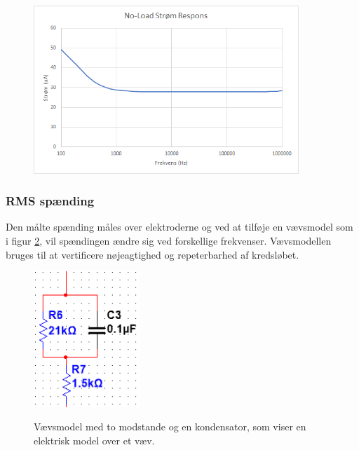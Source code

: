 \begin{figure}[H]
\centering
\includegraphics[width=10cm]{Figure/testopstilling1multisimnoloadgraf}
\label{fig:testopstilling1multisimnoloadgraf}
\end{figure}


\subsubsection{RMS spænding}

Den målte spænding måles over elektroderne og ved at tilføje en vævsmodel som i figur \ref{fig:testopstilling1multisimvaevs}, vil spændingen ændre sig ved forskellige frekvenser. Vævsmodellen bruges til at vertificere nøjeagtighed og repeterbarhed af kredsløbet\cite{Aroom2009}.

\begin{figure}[H]
\centering
{\includegraphics[width=4cm]
{Figure/testopstilling1multisimvaevs}}
\caption{Vævsmodel med to modstande og en kondensator, som viser en elektrisk model over et væv.}
\label{fig:testopstilling1multisimvaevs}
\end{figure}





